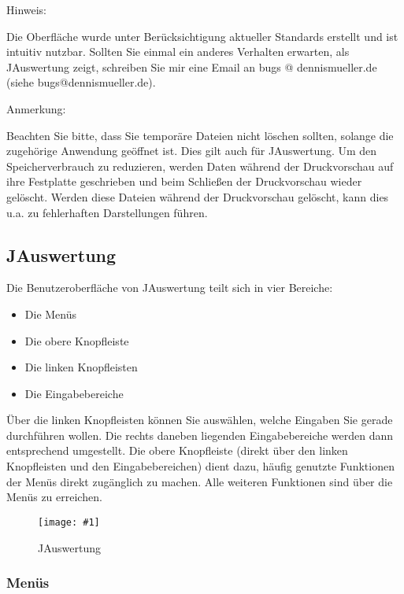 \documentclass[11pt,a4paper,twoside,ngerman]{article}
\newcommand{\hsmimage}[3]{\begin{figure}[!ht]\centering\texttt{[image: \#1]}\caption{#3}\end{figure}}
\begin{document}
\begin{bfseries}Hinweis:\end{bfseries} Die Oberfläche wurde unter Berücksichtigung aktueller Standards erstellt und ist intuitiv nutzbar. Sollten Sie einmal ein anderes Verhalten erwarten, als JAuswertung zeigt, schreiben Sie mir eine Email an bugs @ dennismueller.de (siehe bugs@dennismueller.de).

\begin{bfseries}Anmerkung:\end{bfseries} Beachten Sie bitte, dass Sie temporäre Dateien nicht löschen sollten, solange die zugehörige Anwendung geöffnet ist. Dies gilt auch für JAuswertung. Um den Speicherverbrauch zu reduzieren, werden Daten während der Druckvorschau auf ihre Festplatte geschrieben und beim Schließen der Druckvorschau wieder gelöscht. Werden diese Dateien während der Druckvorschau gelöscht, kann dies u.a. zu fehlerhaften Darstellungen führen.


\newpage

\subsection{JAuswertung}
\label{lbl:jauswertung::begin}
Die Benutzeroberfläche von JAuswertung teilt sich in vier Bereiche:


\begin{itemize}

\item Die Menüs


\item Die obere Knopfleiste


\item Die linken Knopfleisten


\item Die Eingabebereiche


\end{itemize}
Über die linken Knopfleisten können Sie auswählen, welche Eingaben Sie gerade durchführen wollen. Die rechts daneben liegenden Eingabebereiche werden dann entsprechend umgestellt. Die obere Knopfleiste (direkt über den linken Knopfleisten und den Eingabebereichen) dient dazu, häufig genutzte Funktionen der Menüs direkt zugänglich zu machen. Alle weiteren Funktionen sind über die Menüs zu erreichen.


\hsmimage{pics/jauswertung}{.80\textwidth}{JAuswertung}

\newpage

\subsubsection{Menüs}
\label{lbl:jauswertungmenus::begin}
\end{document}
